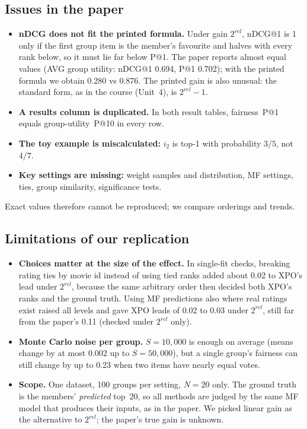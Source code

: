 \documentclass[11pt,a4paper]{article}
\newcommand{\xpo}{XPO}
\begin{document}
\subsection{Issues in the paper}\label{sec:paper}
\begin{itemize}
\item \textbf{nDCG does not fit the printed formula.} Under gain $2^{rel}$,
nDCG@1 is 1 only if the first group item is the member's favourite and halves
with every rank below, so it must lie far below P@1. The paper reports almost
equal values (AVG group utility: nDCG@1 0.694, P@1 0.702); with the printed
formula we obtain 0.280 vs 0.876. The printed gain is also unusual: the
standard form, as in the course (Unit~4), is $2^{rel}-1$.
\item \textbf{A results column is duplicated.} In both result tables,
fairness~P@1 equals group-utility~P@10 in every row.
\item \textbf{The toy example is miscalculated:} $i_2$ is top-1 with probability $3/5$, not $4/7$.
\item \textbf{Key settings are missing:} weight samples and distribution, MF
settings, ties, group similarity, significance tests.
\end{itemize}
Exact values therefore cannot be reproduced; we compare orderings and trends.

\subsection{Limitations of our replication}
\begin{itemize}
\item \textbf{Choices matter at the size of the effect.} In single-fit checks,
breaking rating ties by movie id instead of using tied ranks added about 0.02 to
\xpo{}'s lead under $2^{rel}$, because the same arbitrary order then decided
both \xpo{}'s ranks and the ground truth. Using MF predictions also where real
ratings exist raised all levels and gave \xpo{} leads of 0.02 to 0.03 under
$2^{rel}$, still far from the paper's 0.11 (checked under $2^{rel}$ only).
\item \textbf{Monte Carlo noise per group.} $S=10{,}000$ is enough on average
(means change by at most 0.002 up to $S=50{,}000$), but a single group's
fairness can still change by up to 0.23 when two items have nearly equal
votes.
\item \textbf{Scope.} One dataset, 100 groups per setting, $N=20$ only. The
ground truth is the members' \emph{predicted} top~20, so all methods are judged
by the same MF model that produces their inputs, as in the paper. We picked linear gain as the alternative to
$2^{rel}$; the paper's true gain is unknown.
\end{itemize}
\end{document}
